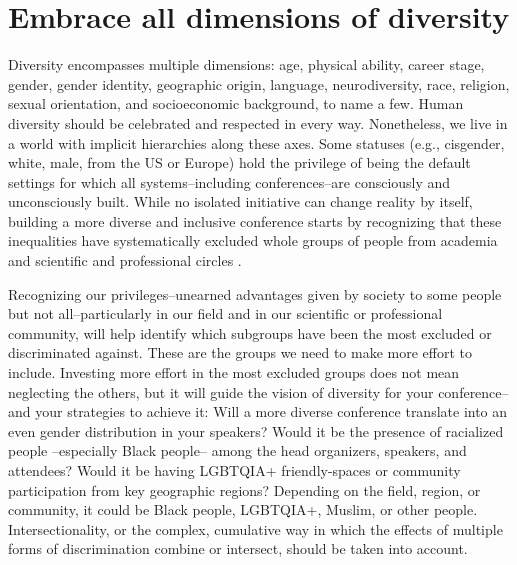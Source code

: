 \documentclass[10pt,letterpaper]{article}
\begin{document}
\section{Embrace all dimensions of diversity}
\label{rule_diversity}

Diversity encompasses multiple dimensions: age, physical ability, career stage, gender, gender identity, geographic origin, language, neurodiversity, race, religion, sexual orientation, and socioeconomic background, to name a few. 
Human diversity should be celebrated and respected in every way. Nonetheless, we live in a world with implicit hierarchies along these axes. Some statuses (e.g., cisgender, white, male, from the US or Europe) hold the privilege of being the default settings for which all systems--including conferences--are consciously and unconsciously built.  
While no isolated initiative can change reality by itself, building a more diverse and inclusive conference starts by recognizing that these inequalities have systematically excluded whole groups of people from academia and scientific and professional circles \cite{timperleyHeMoanaPukepuke2020}. 

Recognizing our privileges--unearned advantages given by society to some people but not all--particularly in our field and in our scientific or professional community, will help identify which subgroups have been the most excluded or discriminated against. 
These are the groups we need to make more effort to include. 
Investing more effort in the most excluded groups does not mean neglecting the others, but it will guide the vision of diversity for your conference--and your strategies to achieve it:
Will a more diverse conference translate into an even gender distribution in your speakers? 
Would it be the presence of racialized people --especially Black people-- among the head organizers, speakers, and attendees? 
Would it be having LGBTQIA+ friendly-spaces or community participation from key geographic regions?
Depending on the field, region, or community, it could be Black people, LGBTQIA+, Muslim, or other people.
Intersectionality, or the complex, cumulative way in which the effects of multiple forms of discrimination combine or intersect, should be taken into account. 
\end{document}

